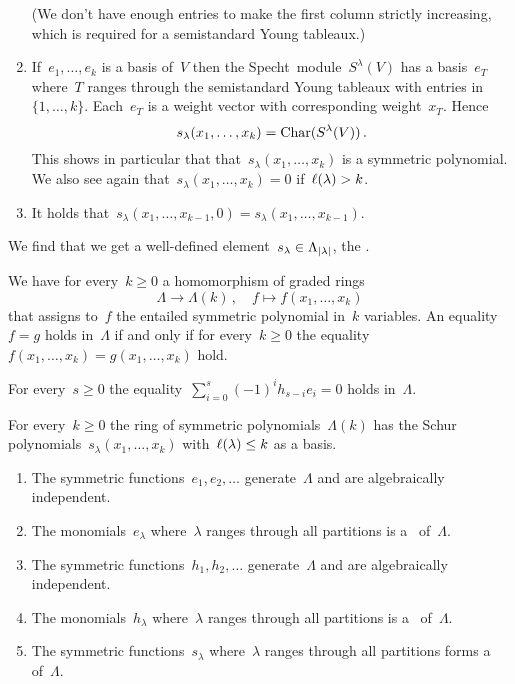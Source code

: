 \documentclass[a4paper,10pt]{scrartcl}
\begin{document}
\begin{example}
\begin{enumerate}
      (We don’t have enough entries to make the first column strictly increasing, which is required for a semistandard Young tableaux.)
    \item
      If~$e_1, \dotsc, e_k$ is a basis of~$V$ then the Specht~module~$S^\lambda(V)$ has a basis~$e_T$ where~$T$ ranges through the semistandard Young tableaux with entries in~$\{1, \dotsc, k\}$.
      Each~$e_T$ is a weight vector with corresponding weight~$x_T$.
      Hence
      \[
        s_\lambda(x_1, \dotsc, x_k)
        =
        \operatorname{Char}(S^\lambda(V)) \,.
      \]
      This shows in particular that that~$s_\lambda(x_1, \dotsc, x_k)$ is a symmetric polynomial.
      We also see again that~$s_\lambda(x_1, \dotsc, x_k) = 0$ if~$\operatorname{\ell}(\lambda) > k$.
    \item
      It holds that~$s_\lambda(x_1, \dotsc, x_{k-1}, 0) = s_\lambda(x_1, \dotsc, x_{k-1})$.
  \end{enumerate}
  We find that we get a well-defined element~$s_\lambda \in \Lambda_{\lvert\lambda\rvert}$, the .
\end{example}

We have for every~$k \geq 0$ a homomorphism of graded rings
\[
  \Lambda
  \to
  \Lambda(k) \,,
  \quad
  f
  \mapsto
  f(x_1, \dotsc, x_k)
\]
that assigns to~$f$ the entailed symmetric polynomial in~$k$ variables.
An equality~$f = g$ holds in~$\Lambda$ if and only if for every~$k \geq 0$ the equality~$f(x_1, \dotsc, x_k) = g(x_1, \dotsc, x_k)$ hold.

\begin{example}
  For every~$s \geq 0$ the equality~$\sum_{i=0}^s (-1)^i h_{s-i} e_i = 0$ holds in~$\Lambda$.
\end{example}

\begin{proposition}
  For every~$k \geq 0$ the ring of symmetric polynomials~$\Lambda(k)$ has the Schur polynomials~$s_\lambda(x_1, \dotsc, x_k)$ with~$\operatorname{\ell}(\lambda) \leq k$ as a basis.
\end{proposition}

\begin{proposition}
  \leavevmode
  \begin{enumerate}
    \item
      The symmetric functions~$e_1, e_2, \dotsc$ generate~$\Lambda$ and are algebraically independent.
    \item
      The monomials~$e_\lambda$ where~$\lambda$ ranges through all partitions is a~{\basis{$\Integer$}} of~$\Lambda$.
    \item
      The symmetric functions~$h_1, h_2, \dotsc$ generate~$\Lambda$ and are algebraically independent.
    \item
      The monomials~$h_\lambda$ where~$\lambda$ ranges through all partitions is a~{\basis{$\Integer$}} of~$\Lambda$.
    \item
      The symmetric functions~$s_\lambda$ where~$\lambda$ ranges through all partitions forms a~{\basis{$\Integer$}} of~$\Lambda$.
  \end{enumerate}
\end{proposition}
\end{document}
